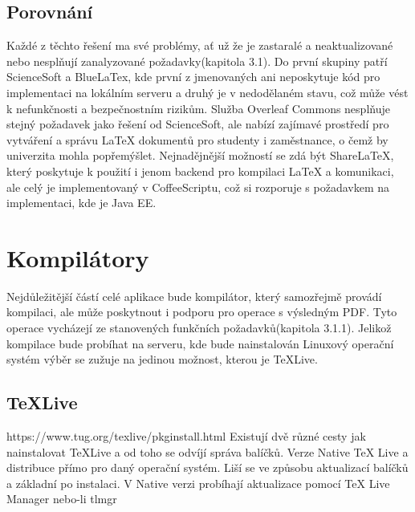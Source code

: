 \subsection{Porovnání}
Každé z těchto řešení ma své problémy, ať už že je zastaralé a neaktualizované nebo nesplňují zanalyzované požadavky(kapitola 3.1). Do první skupiny patří ScienceSoft a BlueLaTex, kde první z jmenovaných ani neposkytuje kód pro implementaci na lokálním serveru a druhý je v nedodělaném stavu, což může vést k nefunkčnosti a bezpečnostním rizikům. Služba Overleaf Commons nesplňuje stejný požadavek jako řešení od ScienceSoft, ale nabízí zajímavé prostředí pro vytváření a správu LaTeX dokumentů pro studenty i zaměstnance, o čemž by univerzita mohla popřemýšlet. Nejnadějnější možností se zdá být ShareLaTeX, který poskytuje k použití i jenom backend pro kompilaci LaTeX a komunikaci, ale celý je implementovaný v CoffeeScriptu, což si rozporuje s požadavkem na implementaci, kde je Java EE. 

\section{Kompilátory}
Nejdůležitější částí celé aplikace bude kompilátor, který samozřejmě provádí kompilaci, ale může poskytnout i podporu pro operace s výsledným PDF. Tyto operace vycházejí ze stanovených funkčních požadavků(kapitola 3.1.1). Jelikož kompilace bude probíhat na serveru, kde bude nainstalován Linuxový operační systém výběr se zužuje na jedinou možnost, kterou je TeXLive.

\subsection{TeXLive}
https://www.tug.org/texlive/pkginstall.html
Existují dvě různé cesty jak nainstalovat TeXLive a od toho se odvíjí správa balíčků. Verze Native TeX Live a distribuce přímo pro daný operační systém. Liší se ve způsobu aktualizací balíčků a základní po instalaci. V Native verzi probíhají aktualizace pomocí TeX Live Manager nebo-li tlmgr 
